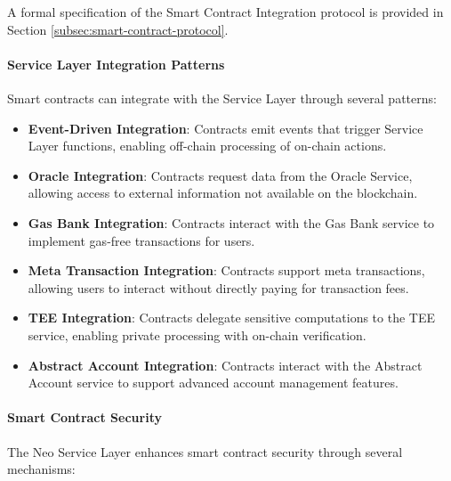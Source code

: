 A formal specification of the Smart Contract Integration protocol is provided in Section \ref{subsec:smart-contract-protocol}.



\paragraph{Service Layer Integration Patterns}
Smart contracts can integrate with the Service Layer through several patterns:

\begin{itemize}
    \item \textbf{Event-Driven Integration}: Contracts emit events that trigger Service Layer functions, enabling off-chain processing of on-chain actions.
    
    \item \textbf{Oracle Integration}: Contracts request data from the Oracle Service, allowing access to external information not available on the blockchain.
    
    \item \textbf{Gas Bank Integration}: Contracts interact with the Gas Bank service to implement gas-free transactions for users.
    
    \item \textbf{Meta Transaction Integration}: Contracts support meta transactions, allowing users to interact without directly paying for transaction fees.
    
    \item \textbf{TEE Integration}: Contracts delegate sensitive computations to the TEE service, enabling private processing with on-chain verification.
    
    \item \textbf{Abstract Account Integration}: Contracts interact with the Abstract Account service to support advanced account management features.
\end{itemize}

\paragraph{Smart Contract Security}
The Neo Service Layer enhances smart contract security through several mechanisms:

